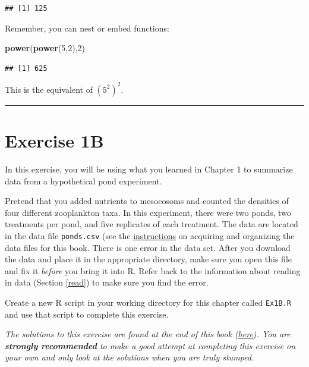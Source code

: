 \documentclass[]{book}
\newenvironment{Shaded}{\begin{snugshade}}{\end{snugshade}}
\newcommand{\KeywordTok}[1]{\textcolor[rgb]{0.13,0.29,0.53}{\textbf{#1}}}
\newcommand{\DecValTok}[1]{\textcolor[rgb]{0.00,0.00,0.81}{#1}}
\newcommand{\NormalTok}[1]{#1}
\theoremstyle{definition}
\theoremstyle{definition}
\theoremstyle{definition}
\theoremstyle{remark}
\begin{document}
\begin{verbatim}
## [1] 125
\end{verbatim}

Remember, you can nest or embed functions:

\begin{Shaded}
\begin{Highlighting}[]
\KeywordTok{power}\NormalTok{(}\KeywordTok{power}\NormalTok{(}\DecValTok{5}\NormalTok{,}\DecValTok{2}\NormalTok{),}\DecValTok{2}\NormalTok{)}
\end{Highlighting}
\end{Shaded}

\begin{verbatim}
## [1] 625
\end{verbatim}

This is the equivalent of \((5^2)^2\).

\begin{center}\rule{0.5\linewidth}{\linethickness}\end{center}

\hypertarget{ex1b}{\section*{Exercise 1B}\label{ex1b}}

In this exercise, you will be using what you learned in Chapter 1 to
summarize data from a hypothetical pond experiment.

Pretend that you added nutrients to mesocosoms and counted the densities
of four different zooplankton taxa. In this experiment, there were two
ponds, two treatments per pond, and five replicates of each treatment.
The data are located in the data file \texttt{ponds.csv} (see the
\protect\hyperlink{data-sets}{instructions} on acquiring and organizing
the data files for this book. There is one error in the data set. After
you download the data and place it in the appropriate directory, make
sure you open this file and fix it \emph{before} you bring it into R.
Refer back to the information about reading in data (Section \ref{read})
to make sure you find the error.

Create a new R script in your working directory for this chapter called
\texttt{Ex1B.R} and use that script to complete this exercise.

\emph{The solutions to this exercise are found at the end of this book
(\protect\hyperlink{ex1b-answers}{here}). You are \textbf{strongly
recommended} to make a good attempt at completing this exercise on your
own and only look at the solutions when you are truly stumped.}
\end{document}
